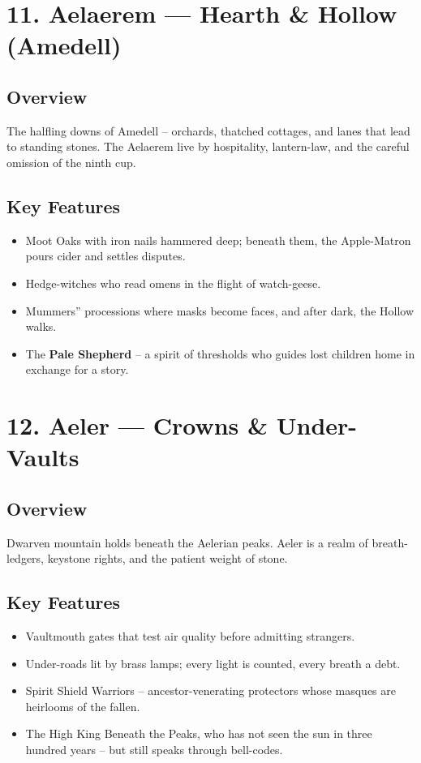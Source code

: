 \documentclass[11pt]{article}
\begin{document}
\section*{11. Aelaerem --- Hearth \& Hollow (Amedell)}

\subsection*{Overview}
The halfling downs of Amedell -- orchards, thatched cottages, and lanes that lead to standing stones. The Aelaerem live by hospitality, lantern-law, and the careful omission of the ninth cup.

\subsection*{Key Features}
\begin{itemize}[leftmargin=*]
    \item Moot Oaks with iron nails hammered deep; beneath them, the Apple-Matron pours cider and settles disputes.
    \item Hedge-witches who read omens in the flight of watch-geese.
    \item Mummers'' processions where masks become faces, and after dark, the Hollow walks.
    \item The \textbf{Pale Shepherd} -- a spirit of thresholds who guides lost children home in exchange for a story.
\end{itemize}

\section*{12. Aeler --- Crowns \& Under-Vaults}

\subsection*{Overview}
Dwarven mountain holds beneath the Aelerian peaks. Aeler is a realm of breath-ledgers, keystone rights, and the patient weight of stone.

\subsection*{Key Features}
\begin{itemize}[leftmargin=*]
    \item Vaultmouth gates that test air quality before admitting strangers.
    \item Under-roads lit by brass lamps; every light is counted, every breath a debt.
    \item Spirit Shield Warriors -- ancestor-venerating protectors whose masques are heirlooms of the fallen.
    \item The High King Beneath the Peaks, who has not seen the sun in three hundred years -- but still speaks through bell-codes.
\end{itemize}
\end{document}
